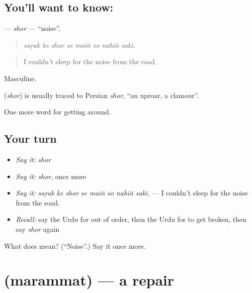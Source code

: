 \subsection*{You'll want to know: }
\textbf{} — \emph{shor} — \textquotedblleft{}noise\textquotedblright{}.

\begin{quote}
       
\end{quote}

\begin{quote}
\emph{saṛak ke shor se maiṅ so nahīṅ sakī.}
\end{quote}

\begin{quote}
I couldn't sleep for the noise from the road.
\end{quote}

Masculine.

\begin{cousinweb}
\textbf{} (\emph{shor}) is usually traced to Persian \emph{shor}, \textquotedblleft{}an uproar, a clamour\textquotedblright{}.
\end{cousinweb}

\begin{grammarlens}[title={What you've built}]
One more word for getting around.
\end{grammarlens}

\subsection*{Your turn}
\begin{itemize}
\raggedright
  \item \emph{Say it:} \emph{shor}
  \item \emph{Say it:} \emph{shor}, once more
  \item \emph{Say it:} \emph{saṛak ke shor se maiṅ so nahīṅ sakī.} — I couldn't sleep for the noise from the road.
  \item \emph{Recall:} say the Urdu for out of order, then the Urdu for to get broken, then say \emph{shor} again
\end{itemize}

\begin{tcolorbox}[breakable,colback=teal!4,colframe=teal!35!black,title={Before you move on}]
What does  mean? (\textquotedblleft{}Noise\textquotedblright{}.) Say it once more.
\end{tcolorbox}
\section[\texorpdfstring{\ur{مرمت} (marammat)}{مرمت (marammat)}]{ (marammat) — a repair}

